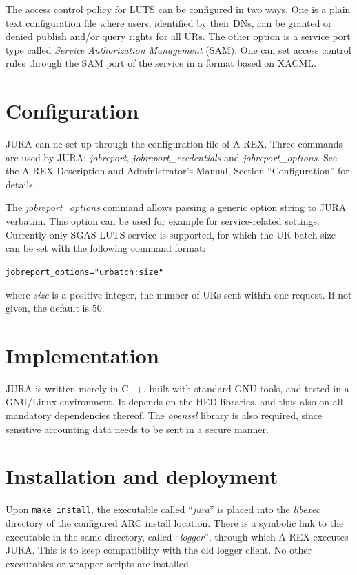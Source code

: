 \documentclass{article}                            %
\begin{document}
The access control policy for LUTS can be configured in two ways. One
is a plain text configuration file where users, identified by their
DNs, can be granted or denied publish and/or query rights for all
URs. The other option is a service port type called \textit{Service
  Authorization Management} (SAM). One can set access control rules
through the SAM port of the service in a format based on XACML. 

\section{Configuration}
\label{config}

JURA can ne set up through the configuration file of A-REX. Three
commands are used by JURA: \textit{jobreport},
\textit{jobreport\_credentials} and \textit{jobreport\_options}. See the
A-REX Description and Administrator's Manual\cite{arex}, Section
``Configuration'' for details.

The \textit{jobreport\_options} command allows passing a generic option
string to JURA verbatim. This option can be used for example for
service-related settings. Currently only SGAS LUTS service is
supported, for which the UR batch size can be set with the following
command format:

\verb|jobreport_options="urbatch:size"|

where \textit{size} is a positive integer, the number of URs sent
within one request. If not given, the default is 50.

\section{Implementation}
JURA is written merely in C++, built with standard GNU tools, and
tested in a GNU/Linux environment. It depends on the HED libraries,
and thus also on all mandatory dependencies thereof. The
\textit{openssl} library is also required, since sensitive accounting
data needs to be sent in a secure manner.


\section{Installation and deployment}

Upon \verb|make install|, the executable called ``\textit{jura}'' is
placed into the \textit{libexec} directory of the configured ARC
install location. There is a symbolic link %
to the executable in the same directory, called ``\textit{logger}'',
through which A-REX executes JURA. This is to keep compatibility with
the old logger client. No other executables or wrapper scripts are
installed.
\end{document}
